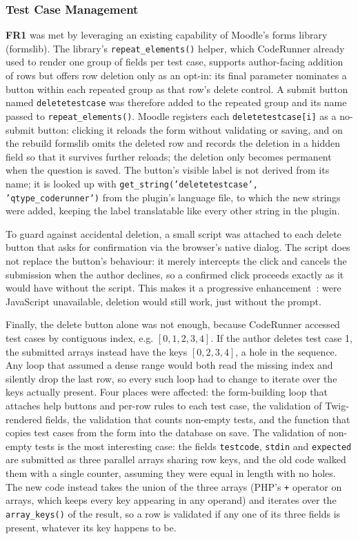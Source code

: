 \subsubsection{Test Case Management}
\textbf{FR1} was met by leveraging an existing capability of Moodle's forms library (formslib). The library's \texttt{repeat\_elements()} helper, which CodeRunner already used to render one group of fields per test case, supports author-facing addition of rows but offers row deletion only as an opt-in: its final parameter nominates a button within each repeated group as that row's delete control. A submit button named \texttt{deletetestcase} was therefore added to the repeated group and its name passed to \texttt{repeat\_elements()}. Moodle registers each \texttt{deletetestcase[i]} as a no-submit button: clicking it reloads the form without validating or saving, and on the rebuild formslib omits the deleted row and records the deletion in a hidden field so that it survives further reloads; the deletion only becomes permanent when the question is saved. The button's visible label is not derived from its name; it is looked up with \texttt{get\_string('deletetestcase', 'qtype\_coderunner')} from the plugin's language file, to which the new strings were added, keeping the label translatable like every other string in the plugin.

To guard against accidental deletion, a small script was attached to each delete button that asks for confirmation via the browser's native dialog. The script does not replace the button's behaviour: it merely intercepts the click and cancels the submission when the author declines, so a confirmed click proceeds exactly as it would have without the script. This makes it a progressive enhancement~\cite{mdnprogressiveenhancement}: were JavaScript unavailable, deletion would still work, just without the prompt.

Finally, the delete button alone was not enough, because CodeRunner accessed test cases by contiguous index, e.g. $[0,1,2,3,4]$. If the author deletes test case 1, the submitted arrays instead have the keys $[0,2,3,4]$, a hole in the sequence. Any loop that assumed a dense range would both read the missing index and silently drop the last row, so every such loop had to change to iterate over the keys actually present. Four places were affected: the form-building loop that attaches help buttons and per-row rules to each test case, the validation of Twig-rendered fields, the validation that counts non-empty tests, and the function that copies test cases from the form into the database on save. The validation of non-empty tests is the most interesting case: the fields \texttt{testcode}, \texttt{stdin} and \texttt{expected} are submitted as three parallel arrays sharing row keys, and the old code walked them with a single counter, assuming they were equal in length with no holes. The new code instead takes the union of the three arrays (PHP's \texttt{+} operator on arrays, which keeps every key appearing in any operand) and iterates over the \texttt{array\_keys()} of the result, so a row is validated if any one of its three fields is present, whatever its key happens to be.

